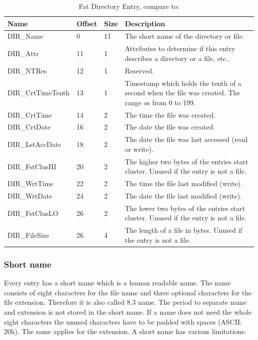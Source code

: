 \begin{table}[!ht]
\caption{Fat Directory Entry, compare to: \cite{usb_ms_jan, fatgen103}}
\centering
\begin{tabular}{|l|l|l|p{8.5cm}|}
\hline\hline
\textbf{Name} & \textbf{Offset} & \textbf{Size} & \textbf{Description}\\ \hline
DIR\_Name & 0 & 11 & The short name of the directory or file. \\ \hline
DIR\_Attr & 11 & 1 & Attributes to determine if this entry describes a directory or a file, etc.. \\ \hline
DIR\_NTRes & 12 & 1 & Reserved. \\ \hline
DIR\_CrtTimeTenth & 13 & 1 & Timestamp which holds the tenth of a second when the file was created. The range os from 0 to 199. \\ \hline
DIR\_CrtTime & 14 & 2 & The time the file was created. \\ \hline
DIR\_CrtDate & 16 & 2 & The date the file was created. \\ \hline
DIR\_LstAccDate & 18 & 2 & The date the file was last accessed (read or write). \\ \hline
DIR\_FstClusHI & 20 & 2 & The higher two bytes of the entries start cluster. Unused if the entry is not a file. \\ \hline
DIR\_WrtTime & 22 & 2 & The time the file last modified (write). \\ \hline
DIR\_WrtDate & 24 & 2 & The date the file last modified (write). \\ \hline
DIR\_FstClusLO & 26 & 2 & The lower two bytes of the entries start cluster. Unused if the entry is not a file. \\ \hline
DIR\_FileSize & 26 & 4 & The length of a file in bytes. Unused if the entry is not a file. \\ \hline
\end{tabular}
\label{table:fat_dir_entry}
\end{table}

\subsubsection{Short name}

Every entry has a short name which is a human readable name. The name consists of eight characters for the file name and three optional characters for the file extension. Therefore it is also called 8.3 name. The period to separate name and extension is not stored in the short name. If a name does not need the whole eight characters the unused characters have to be padded with spaces (ASCII: 20h). The same applies for the extension. A short name has various limitations\cite{usb_ms_jan}:

